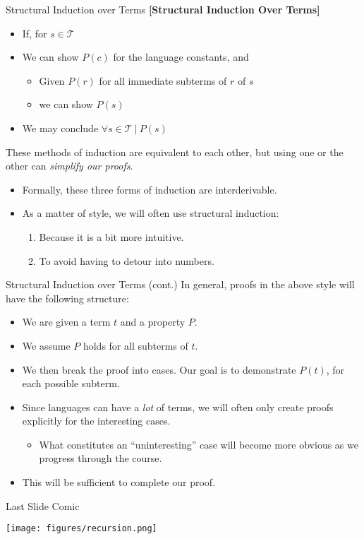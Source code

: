 \documentclass[11pt]{beamer}
\begin{document}
\begin{frame}[fragile=singleslide]{Structural Induction over Terms}
\textbf{[Structural Induction Over Terms]}
\begin{itemize}
\item If, for $s \in \mathcal{T}$
\item We can show $P(c)$ for the language constants, and
\begin{itemize}
\item Given $P(r)$ for all immediate subterms of $r$ of $s$
\item we can show $P(s)$
\end{itemize}
\item We may conclude $\forall s \in \mathcal{T} \:|\: P(s)$
\end{itemize}
These methods of induction are equivalent to each other, but using one or the other can \emph{simplify our proofs}.
\begin{itemize}
\item Formally, these three forms of induction are interderivable.  
\item As a matter of style, we will often use structural induction:
\begin{enumerate}
\item Because it is a bit more intuitive.
\item To avoid having to detour into numbers.
\end{enumerate}
\end{itemize}
\end{frame}

\begin{frame}[fragile=singleslide]{Structural Induction over Terms (cont.)}
In general, proofs in the above style will have the following structure:
\begin{itemize}
\item We are given a term $t$ and a property $P$.
\item We assume $P$ holds for all subterms of $t$.
\item We then break the proof into cases.  Our goal is to demonstrate $P(t)$, for each possible subterm.  
\item Since languages can have a \emph{lot} of terms, we will often only create proofs explicitly for the interesting cases.  
\begin{itemize}
\item What constitutes an ``uninteresting'' case will become more obvious as we progress through the course.  
\end{itemize}
\item This will be sufficient to complete our proof.
\end{itemize}
\end{frame}

\begin{frame}[fragile=singleslide]{Last Slide Comic}
\begin{center}
\texttt{[image: figures/recursion.png]}
\end{center}
\end{frame}
\end{document}
